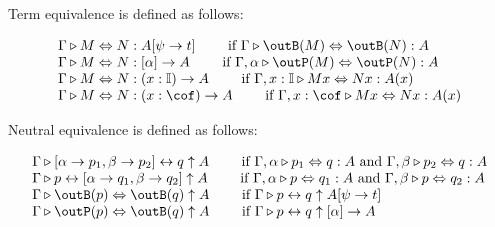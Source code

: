 \documentclass{article}
\begin{document}
\begin{definition}
  Term equivalence is defined as follows:

  \[
    \begin{array}{lr}
      \Gamma \triangleright M \Leftrightarrow N : A[\psi \to t] \qquad \text{ if } \Gamma \triangleright \outB(M) \Leftrightarrow \outB(N) : A\\
      \Gamma \triangleright M \Leftrightarrow N : [\alpha] \to A \qquad \text{ if } \Gamma, \alpha \triangleright \outP(M) \Leftrightarrow \outP(N) : A\\
      \Gamma \triangleright M \Leftrightarrow N : (x : \mathbb{I}) \to A \qquad \text{ if } \Gamma, x : \mathbb{I} \triangleright M x \Leftrightarrow N x : A(x)\\
      \Gamma \triangleright M \Leftrightarrow N : (x : \cof) \to A \qquad \text{ if } \Gamma, x : \cof \triangleright M x \Leftrightarrow N x : A(x)\\
    \end{array}
  \]
\end{definition}

\begin{definition}
  Neutral equivalence is defined as follows:

  \[
    \begin{array}{lr}
      \Gamma \triangleright [\alpha \to p_{1}, \beta \to p_{2}] \leftrightarrow q \uparrow A \qquad \text{ if } \Gamma, \alpha \triangleright p_{1} \Leftrightarrow q : A \text{ and } \Gamma, \beta \triangleright p_{2} \Leftrightarrow q : A \\

      \Gamma \triangleright p \leftrightarrow [\alpha \to q_{1}, \beta \to q_{2}] \uparrow A \qquad \text{ if } \Gamma, \alpha \triangleright p \Leftrightarrow q_{1} : A \text{ and } \Gamma, \beta \triangleright p \Leftrightarrow q_{2} : A \\

      \Gamma \triangleright \outB(p) \Leftrightarrow \outB(q) \uparrow A \qquad \text{ if } \Gamma \triangleright p \leftrightarrow q \uparrow A[\psi \to t]\\

      \Gamma \triangleright \outP(p) \Leftrightarrow \outB(q) \uparrow A \qquad \text{ if } \Gamma \triangleright p \leftrightarrow q \uparrow [\alpha] \to A\\

    \end{array}
  \]
\end{definition}
\end{document}
